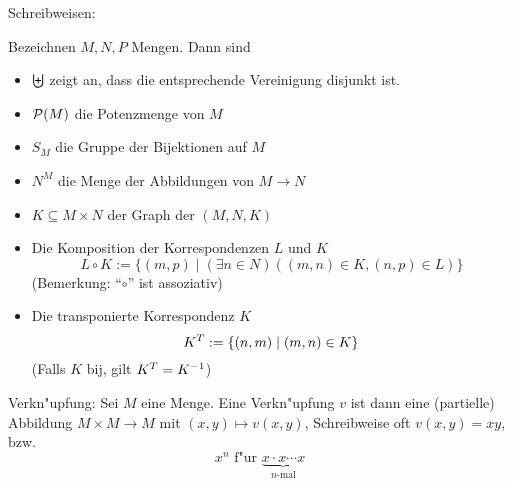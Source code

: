  Schreibweisen:{
  Bezeichnen $M,N,P$ Mengen. Dann sind
  \begin{itemize}
    \item $\bigcupd$ zeigt an, dass die entsprechende Vereinigung disjunkt ist.
    \item $\cal P(M)$ die Potenzmenge von $M$
    \item $S_M$ die Gruppe der Bijektionen auf $M$
    \item $N^M$ die Menge der Abbildungen von $M\to N$
    \item $K\subseteq M\times N$ der Graph der 
      $(M,N,K)$
    \item Die Komposition der Korrespondenzen $L$ und $K$
      \[L\circ K:=\{ (m,p)\mid (\exists n\in N)((m,n)\in K, (n,p)\in L)\}
        \]
      (Bemerkung: ``$\circ$'' ist assoziativ)
    \item Die transponierte Korrespondenz $K$
      \[\transpose K:=\{ (n,m) \mid (m,n)\in K \}
        \]
      (Falls $K$ bij, gilt $\transpose K = K^{-1}$)
    \end{itemize}
  }
 Verkn"upfung:{
  Sei $M$ eine Menge. Eine Verkn"upfung $v$ ist dann eine (partielle) Abbildung
  $M\times M\to M$ mit $(x,y)\mapsto v(x,y)$, Schreibweise oft $v(x,y)=xy$, bzw.
  \[x^n \text{ f"ur } \underbrace{x\cdot x\cdots x}_{\text{$n$-mal}}
    \]
  }
